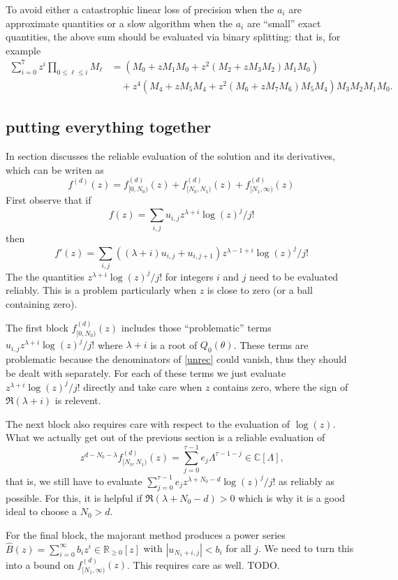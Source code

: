 \documentclass[10pt]{article}
\numberwithin{equation}{section}
\begin{document}
To avoid either a catastrophic linear loss of precision when the $a_i$ are approximate quantities or a slow algorithm when the $a_i$ are ``small'' exact quantities, the above sum should be evaluated via binary splitting: that is, for example
\begin{align*}
\sum_{i=0}^{7} z^{i} \prod_{0\le \ell \le i}M_{\ell} &= (M_0 + z M_1 M_0 + z^2(M_2 + z M_3 M_2) M_1 M_0)\\
& \quad + z^4 (M_4 + z M_5 M_4 + z^2(M_6 + z M_7 M_6) M_5 M_4)M_3 M_2 M_1 M_0\text{.}
\end{align*}

\subsection{putting everything together}
In section discusses the reliable evaluation of the solution and its derivatives, which can be writen as
\begin{equation*}
f^{(d)}(z) = f_{[0,N_0)}^{(d)}(z) + f_{[N_0,N_1)}^{(d)}(z) + f_{[N_1,\infty)}^{(d)}(z)
\end{equation*}
First observe that if
\begin{equation*}
f(z) = \sum_{i,j} u_{i,j} z^{\lambda+i} \log(z)^j/j!
\end{equation*}
then
\begin{equation*}
f'(z) = \sum_{i,j} \left((\lambda+i)u_{i,j} + u_{i,j+1}\right) z^{\lambda-1+i} \log(z)^j/j!
\end{equation*}
The the quantities $z^{\lambda+i} \log(z)^j/j!$ for integers $i$ and $j$ need to be evaluated reliably. This is a problem particularly when $z$ is close to zero (or a ball containing zero).

The first block $f_{[0,N_0)}^{(d)}(z)$ includes those ``problematic'' terms $u_{i,j} z^{\lambda+i} \log(z)^j/j!$ where $\lambda+i$ is a root of $Q_0(\theta)$. These terms are problematic because the denominators of \eqref{unrec} could vanish, thus they should be dealt with separately. For each of these terms we just evaluate $z^{\lambda+i} \log(z)^j/j!$ directly and take care when $z$ contains zero, where the sign of $\Re(\lambda+i)$ is relevent.

The next block also requires care with respect to the evaluation of $\log(z)$. What we actually get out of the previous section is a reliable evaluation of
\begin{equation*}
z^{d - N_0 - \lambda} f_{[N_0,N_1)}^{(d)}(z) = \sum_{j=0}^{\tau-1} e_j \Lambda^{\tau-1-j} \in \mathbb{C}[\Lambda]\text{,}
\end{equation*}
that is, we still have to evaluate $\sum_{j=0}^{\tau-1} e_j z^{\lambda+N_0-d}\log(z)^j/j!$ as reliably as possible. For this, it is helpful if $\Re(\lambda+N_0-d) > 0$ which is why it is a good ideal to choose a $N_0 > d$.

For the final block, the majorant method produces a power series $\hat{B}(z) = \sum_{i=0}^{\infty} b_i z^i \in \mathbb{R}_{\ge 0}[z]$ with $|u_{N_1 + i,j}| < b_i$ for all $j$. We need to turn this into a bound on $f_{[N_1,\infty)}^{(d)}(z)$. This requires care as well. TODO.
\end{document}
